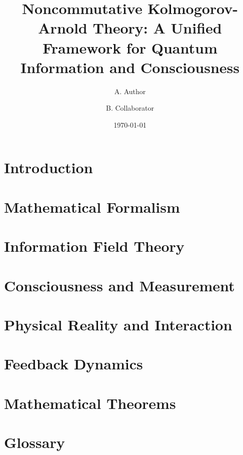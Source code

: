 \documentclass[12pt]{article}
\title{Noncommutative Kolmogorov-Arnold Theory: A Unified Framework for Quantum Information and Consciousness}
\author{A. Author \and B. Collaborator}
\date{\today}
\begin{document}
\maketitle

\section{Introduction}


\section{Mathematical Formalism}


\section{Information Field Theory}


\section{Consciousness and Measurement}


\section{Physical Reality and Interaction}


\section{Feedback Dynamics}


\appendix
\section{Mathematical Theorems}


\section{Glossary}




\end{document}
